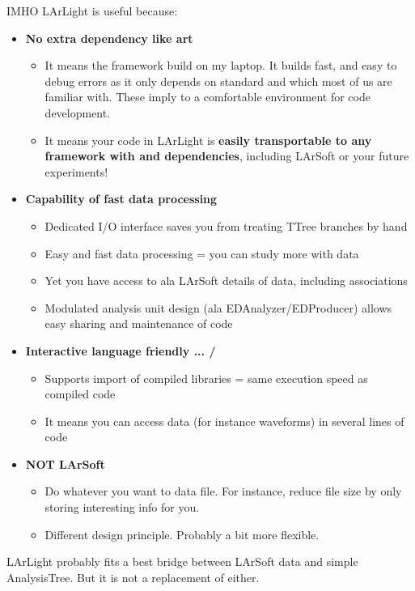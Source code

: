 IMHO LArLight is useful because:
\begin{itemize}
\item[] {\bf No extra dependency like {\ttfamily art}}
  \begin{itemize}
    \item It means the framework build on my laptop. It builds fast, and easy to debug errors as it only depends on standard \CPP and \ROOT which most of us are familiar with. These imply to a comfortable environment for code development.
    \item It means your code in LArLight is {\bf easily transportable to any framework with \CPP and \ROOT dependencies}, including LArSoft or your future experiments!
  \end{itemize}
\item[] {\bf Capability of fast data processing }
  \begin{itemize}
    \item Dedicated I/O interface saves you from treating TTree branches by hand
    \item Easy and fast data processing = you can study more with data
    \item Yet you have access to ala LArSoft details of data, including associations
    \item Modulated analysis unit design (ala EDAnalyzer/EDProducer) allows easy sharing and maintenance of code
  \end{itemize}
\item[] {\bf Interactive language friendly ... \python / \CINT}
  \begin{itemize}
    \item Supports import of compiled libraries = same execution speed as compiled code
    \item It means you can access data (for instance waveforms) in several lines of code
  \end{itemize}
\item[] {\bf NOT LArSoft}
  \begin{itemize}
    \item Do whatever you want to data file. For instance, reduce file size by only storing interesting info for you.
    \item Different design principle. Probably a bit more flexible.
  \end{itemize}
\end{itemize}    

LArLight probably fits a best bridge between LArSoft data and simple {\ttfamily AnalysisTree}. 
But it is not a replacement of either.


